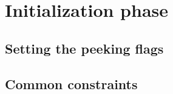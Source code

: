 
\section{Initialization phase         \lispDone{}}
\subsection{Setting the peeking flags \lispDone{}}   \label{hub: initialization phase: setting peeking flags}    
\subsection{Common constraints        \lispDone{}}   \label{hub: initialization phase: common constraints}       

